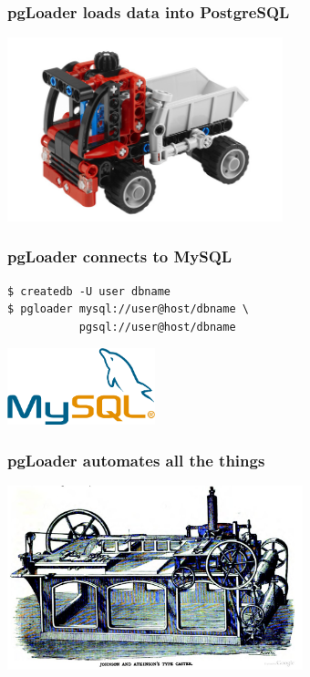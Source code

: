 \documentclass{beamer}
\begin{document}
\begin{frame}[fragile]
  \frametitle{pgLoader loads data into PostgreSQL}


  \begin{center}
    \includegraphics[height=2.1in]{pgloader.jpg}
  \end{center}
\end{frame}

\begin{frame}[fragile]
  \frametitle{pgLoader connects to MySQL}

  \vfill

  \begin{minipage}{0,7\textwidth}
    \begin{verbatim}
$ createdb -U user dbname
$ pgloader mysql://user@host/dbname \
           pgsql://user@host/dbname
    \end{verbatim}
  \end{minipage}

  \begin{center}
    \includegraphics[height=6em]{mysql.png}
  \end{center}
\end{frame}

\begin{frame}
  \frametitle{pgLoader automates all the things}

  \begin{center}
    \includegraphics[height=2.1in]{TypeCaster.jpg}
  \end{center}
\end{frame}
\end{document}
